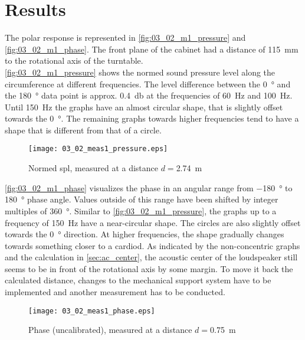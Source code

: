 \section*{Results}\label{sec:03_02_results}
The polar response is represented in \autoref{fig:03_02_m1_pressure} and \autoref{fig:03_02_m1_phase}. The front plane of the cabinet had a distance of \SI{115}{\milli\meter} to the rotational axis of the turntable.\\
\autoref{fig:03_02_m1_pressure} shows the normed sound pressure level  along the circumference at different frequencies. The level difference  between the \SI{0}{\degree} and the \SI{180}{\degree} data point is approx. \SI{0.4}{\decibel} at the frequencies of \SI{60}{\hertz} and \SI{100}{\hertz}. Until \SI{150}{\hertz} the graphs have an almost circular shape, that is slightly offset towards the \SI{0}{\degree}. The remaining graphs towards higher frequencies tend to have a shape that is different from that of a circle.
\begin{figure}[htbp]
	\centering
	\texttt{[image: 03\_02\_meas1\_pressure.eps]}
	\caption{Normed \gls{spl}, measured at a distance \(d=\)\SI{2.74}{\meter}}
		\label{fig:03_02_m1_pressure}
\end{figure}
\autoref{fig:03_02_m1_phase} visualizes the phase in an angular range from \SI{-180}{\degree} to \SI{180}{\degree} phase angle. Values outside of this range have been shifted by integer multiples of \SI{360}{\degree}. Similar to \autoref{fig:03_02_m1_pressure}, the graphs up to a  frequency of \SI{150}{\hertz} have a near-circular shape. The circles are also slightly offset towards the \SI{0}{\degree} direction. At higher frequencies, the shape gradually changes towards something closer to a cardiod.
As indicated  by the non-concentric graphs and the calculation in \autoref{sec:ac_center}, the acoustic center of the loudspeaker still seems to be in front of the rotational axis by some margin. To move it back the calculated distance, changes to the mechanical support system have to be implemented and another measurement has to be conducted.
\begin{figure}[htbp]
	\centering
	\texttt{[image: 03\_02\_meas1\_phase.eps]}
	\caption{Phase (uncalibrated), measured at a distance \(d=\)\SI{0.75}{\meter}}
		\label{fig:03_02_m1_phase}
\end{figure}



